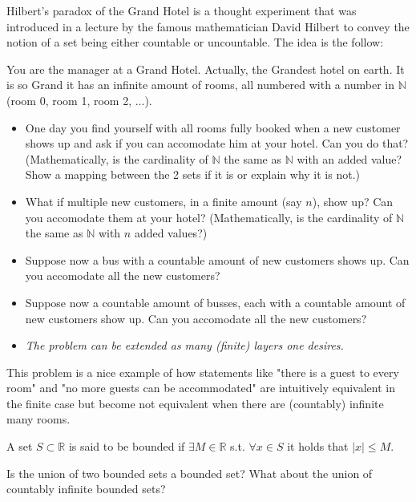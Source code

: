\documentclass[11pt]{article}%
\newcommand{\R}{\mathbb{R}}
\begin{document}
\begin{Exercise}[title=\text{**$\dagger$ - Hilbert's Hotel}]
	Hilbert's paradox of the Grand Hotel is a thought experiment that was introduced in a lecture by the famous mathematician David Hilbert to convey the notion of a set being either countable or uncountable. The idea is the follow:
	
	You are the manager at a Grand Hotel. Actually, the Grandest hotel on earth. It is so Grand it has an infinite amount of rooms, all numbered with a number in $\mathbb N$ (room 0, room 1, room 2, ...). 
	
	\begin{itemize}
		\item One day you find yourself with all rooms fully booked when a new customer shows up and ask if you can accomodate him at your hotel. Can you do that? (Mathematically, is the cardinality of $\mathbb N$ the same as $\mathbb N$ with an added value? Show a mapping between the 2 sets if it is or explain why it is not.)
		
		\item What if multiple new customers, in a finite amount (say $n$), show up? Can you accomodate them at your hotel? (Mathematically, is the cardinality of $\mathbb N$ the same as $\mathbb N$ with $n$ added values?)
		
		\item Suppose now a bus with a countable amount of new customers shows up. Can you accomodate all the new customers?
		
		\item Suppose now a countable amount of busses, each with a countable amount of new customers show up. Can you accomodate all the new customers?
		
		\item \textit{The problem can be extended as many (finite) layers one desires. }
		
	\end{itemize}
	This problem is a nice example of how statements like "there is a guest to every room" and "no more guests can be accommodated" are intuitively equivalent in the finite case but become not equivalent when there are (countably) infinite many rooms. 
	
\end{Exercise}

\begin{Exercise}[title=*]
	A set $S\subset\R$ is said to be bounded if $\exists M\in\mathbb{R}$ s.t. $\forall x\in S$ it holds that $|x|\leq M$.
	
	Is the union of two bounded sets a bounded set? What about the union of countably infinite bounded sets? 
\end{Exercise}
\end{document}
